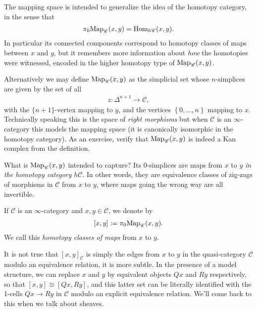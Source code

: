 \documentclass[11pt,openany]{book}
\begin{document}
\begin{intuition} The mapping space is intended to generalize the idea of the homotopy category, in the sense that
\begin{align*}
    \pi_0 \mathrm{Map}_\mathscr{C}(x,y) = \mathrm{Hom}_{h\mathscr{C}}(x,y).
\end{align*}
In particular its connected components correspond to homotopy classes of maps between $x$ and $y$, but it remembers more information about \textit{how} the homotopies were witnessed, encoded in the higher homotopy type of $\mathrm{Map}_\mathscr{C}(x,y)$.
\end{intuition}




\begin{remark} 
Alternatively we may define $\mathrm{Map}_\mathscr{C}(x,y)$ as the simplicial set whose $n$-simplices are given by the set of all
\begin{align*}
    z \colon \Delta^{n+1} \to \mathscr{C},
\end{align*}
with the $\{n+1\}$-vertex mapping to $y$, and the vertices $\left\{ 0, \ldots, n \right\}$ mapping to $x$. 
Technically speaking this is the space of \textit{right morphisms} but when $\mathscr{C}$ is an $\infty$-category this models the mapping space (it is canonically isomorphic in the homotopy category). As an exercise, verify that $\mathrm{Map}_{\mathscr{C}}(x,y)$ is indeed a Kan complex from the definition.
\end{remark}

What is $\mathrm{Map}_\mathscr{C}(x,y)$ intended to capture? Its 0-simplices are maps from $x$ to $y$ \textit{in the homotopy category} $h\mathscr{C}$. In other words, they are equivalence classes of zig-zags of morphisms in $\mathscr{C}$ from $x$ to $y$, where maps going the wrong way are all invertible.

\begin{notation} If $\mathscr{C}$ is an $\infty$-category and $x,y\in\mathscr{C}$, we denote by
\begin{align*}
    \left[ x,y \right] := \pi_0 \mathrm{Map}_{\mathscr{C}}(x,y).
\end{align*}
We call this \textit{homotopy classes of maps} from $x$ to $y$.
\end{notation}

\begin{warning} It is not true that $\left[ x,y \right]_\mathscr{C}$ is simply the edges from $x$ to $y$ in the quasi-category $\mathscr{C}$ modulo an equivalence relation, it is more subtle. In the presence of a model structure, we can replace $x$ and $y$ by equivalent objects $Qx$ and $Ry$ respectively, so that $\left[ x,y \right] \cong \left[ Qx,Ry \right]$, and this latter set can be literally identified with the 1-cells $Qx \to Ry$ in $\mathscr{C}$ modulo an explicit equivalence relation. We'll come back to this when we talk about sheaves.
\end{warning}
\end{document}
